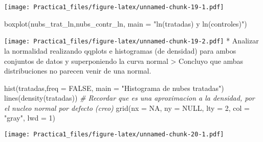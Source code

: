 \documentclass[
]{article}
\newenvironment{Shaded}{\begin{snugshade}}{\end{snugshade}}
\newcommand{\AttributeTok}[1]{\textcolor[rgb]{0.77,0.63,0.00}{#1}}
\newcommand{\CommentTok}[1]{\textcolor[rgb]{0.56,0.35,0.01}{\textit{#1}}}
\newcommand{\ConstantTok}[1]{\textcolor[rgb]{0.00,0.00,0.00}{#1}}
\newcommand{\DecValTok}[1]{\textcolor[rgb]{0.00,0.00,0.81}{#1}}
\newcommand{\FunctionTok}[1]{\textcolor[rgb]{0.00,0.00,0.00}{#1}}
\newcommand{\NormalTok}[1]{#1}
\newcommand{\OtherTok}[1]{\textcolor[rgb]{0.56,0.35,0.01}{#1}}
\newcommand{\SpecialCharTok}[1]{\textcolor[rgb]{0.00,0.00,0.00}{#1}}
\newcommand{\StringTok}[1]{\textcolor[rgb]{0.31,0.60,0.02}{#1}}
\begin{document}
\begin{Shaded}
\end{Shaded}

\texttt{[image: Practica1\_files/figure-latex/unnamed-chunk-19-1.pdf]}

\begin{Shaded}
\begin{Highlighting}[]
\FunctionTok{boxplot}\NormalTok{(nubs\_trat\_ln,nubs\_contr\_ln, }\AttributeTok{main =} \StringTok{"ln(tratadas) y ln(controles)"}\NormalTok{)}
\end{Highlighting}
\end{Shaded}

\texttt{[image: Practica1\_files/figure-latex/unnamed-chunk-19-2.pdf]} *
Analizar la normalidad realizando qqplots e histogramas (de densidad)
para ambos conjuntos de datos y superponiendo la curva normal
\textgreater{} Concluyo que ambas distribuciones no parecen venir de una
normal.

\begin{Shaded}
\begin{Highlighting}[]
\FunctionTok{hist}\NormalTok{(tratadas,}\AttributeTok{freq =} \ConstantTok{FALSE}\NormalTok{, }\AttributeTok{main =} \StringTok{"Histograma de nubes tratadas"}\NormalTok{)}
\FunctionTok{lines}\NormalTok{(}\FunctionTok{density}\NormalTok{(tratadas)) }\CommentTok{\# Recordar que es una aproximacion a la densidad, por el nucleo normal por defecto (creo)}
\FunctionTok{grid}\NormalTok{(}\AttributeTok{nx =} \ConstantTok{NA}\NormalTok{, }\AttributeTok{ny =} \ConstantTok{NULL}\NormalTok{, }\AttributeTok{lty =} \DecValTok{2}\NormalTok{, }\AttributeTok{col =} \StringTok{"gray"}\NormalTok{, }\AttributeTok{lwd =} \DecValTok{1}\NormalTok{)}
\end{Highlighting}
\end{Shaded}

\texttt{[image: Practica1\_files/figure-latex/unnamed-chunk-20-1.pdf]}
\end{document}
